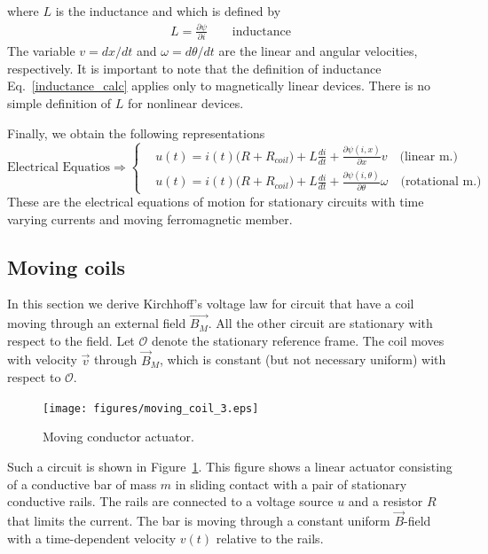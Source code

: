 \documentclass[11pt,a4paper,oneside]{book}
\numberwithin{equation}{section}
\theoremstyle{it}
\theoremstyle{definition}
\begin{document}
where $L$ is the inductance and which is defined by
 \begin{equation}\label{inductance_calc}
	\begin{aligned}
		L = \frac{\partial \psi}{\partial i}\qquad\text{inductance}
	\end{aligned}
\end{equation}
The variable $v=dx/dt$ and $\omega=d\theta/dt$ are the linear and angular velocities, respectively. It is important to note that the definition of inductance Eq.~\eqref{inductance_calc} applies only to magnetically linear devices. There is no simple definition of $L$ for nonlinear devices.

Finally, we obtain the following representations
 \begin{equation}\label{}
	\text{Electrical Equatios}\Rightarrow\left\lbrace 
	\begin{aligned}
		&u(t) = i(t)\big(R+R_{coil}\big) + L\frac{d i}{d t} + \frac{\partial \psi(i,x)}{\partial x}v  \quad\text{(linear m.)} \\[8pt]
		&u(t) = i(t)\big(R+R_{coil}\big) + L\frac{d i}{d t} + \frac{\partial \psi(i,\theta)}{\partial \theta}\omega \quad\text{(rotational m.)}
	\end{aligned}\right. 
\end{equation}
These are the electrical equations of motion for stationary circuits with time varying currents and moving ferromagnetic member.

\subsection{Moving coils}
In this section we derive Kirchhoff's voltage law for circuit that have a coil moving through an external field $\vec{B_M}$. All the other circuit are stationary with respect to the field. Let $\mathcal{O}$ denote the stationary reference frame. The coil moves with velocity $\vec{v}$ through $\vec{B}_M$, which is constant (but not necessary uniform) with respect to $\mathcal{O}$. 
\begin{figure}[H]
	\centering
	\texttt{[image: figures/moving\_coil\_3.eps]}
	\captionsetup{width=0.75\textwidth}		
	\caption{Moving conductor actuator.}
	\label{moving_coil_3}
\end{figure}
Such a circuit is shown in Figure~\ref{moving_coil_3}. This figure shows a linear actuator consisting of a conductive bar of mass $m$ in sliding contact with a pair of stationary conductive rails. The rails are connected to a voltage source $u$ and a resistor $R$ that limits the current. The bar is moving through a constant uniform $\vec{B}$-field with a time-dependent velocity $v(t)$ relative to the rails. 
\end{document}
